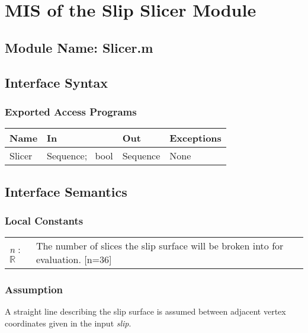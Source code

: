 \documentclass[12pt]{article}
\begin{document}
\section{MIS of the Slip Slicer Module} \label{sec:SlicerMod}

\subsection{Module Name: Slicer.m}

\subsection{Interface Syntax}

\subsubsection{Exported Access Programs}
\begin{center}
\renewcommand*{\arraystretch}{1.5}
\begin{tabular}{| p{} | p{} | 
  p{} | p{} |} \hline 
  \textbf{Name} & \textbf{In} & \textbf{Out} & \textbf{Exceptions}
  \\ \hline

  Slicer & Sequence; ~\newline bool & Sequence & None \\ \hline

\end{tabular}
\end{center}

\subsection{Interface Semantics}

\subsubsection{Local Constants}
\renewcommand*{\arraystretch}{1.5}
\begin{longtable}{p{} p{}}
  \textit{n} : $\mathbb{R}$ & The number of slices the slip surface
  will be broken into for evaluation. [n=36]\\
\end{longtable}

\subsubsection{Assumption}
A straight line describing the slip surface is assumed between
adjacent vertex coordinates given in the input \textit{slip}.
\end{document}
